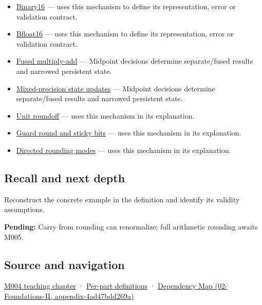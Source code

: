 \begin{itemize}
\item
  \hyperref[appendix-34443cec7170]{Binary16} --- uses this mechanism to define its representation, error or validation contract.
\item
  \hyperref[appendix-18b8dd966b5d]{Bfloat16} --- uses this mechanism to define its representation, error or validation contract.
\item
  \hyperref[appendix-41e8ef22a21e]{Fused multiply-add} --- Midpoint decisions determine separate/fused results and narrowed persistent state.
\item
  \hyperref[appendix-260182e617b7]{Mixed-precision state updates} --- Midpoint decisions determine separate/fused results and narrowed persistent state.
\item
  \hyperref[appendix-bc44f7b42f42]{Unit roundoff} --- uses this mechanism in its explanation.
\item
  \hyperref[appendix-b572b631069b]{Guard round and sticky bits} --- uses this mechanism in its explanation.
\item
  \hyperref[appendix-637d164ae5ca]{Directed rounding modes} --- uses this mechanism in its explanation.
\end{itemize}

\subsection{Recall and next depth}\label{appendix-614afe1de592-recall-and-next-depth}

Reconstruct the concrete example in the definition and identify its validity assumptions.

\textbf{Pending:} Carry from rounding can renormalize; full arithmetic rounding awaits M005.

\subsection{Source and navigation}\label{appendix-614afe1de592-source-and-navigation}

\hyperref[01-foundations-i-ch001-a-stretching-ruler-for-real-valued-quantities]{M004 teaching chapter} · \hyperref[appendix-fd090d982a15-m004---parts-61-76]{Per-part definitions} · \href{../02-Foundations-II/main.pdf\#nameddest=appendix-4ad47bdd269a}{Dependency Map (02-Foundations-II, appendix-4ad47bdd269a)}
